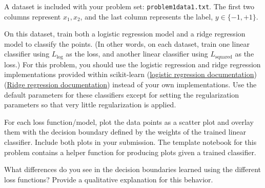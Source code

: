 \newpage

\problem[9]
A dataset is included with your problem set: \texttt{problem1data1.txt}. The first two columns represent $x_1, x_2$, and the last column represents the label, $y \in \{-1,+1\}$.

On this dataset, train both a logistic regression model and a ridge regression model to classify the points.  (In other words, on each dataset, train one linear classifier using $L_\text{log}$ as the loss, and another linear classifier using $L_\text{squared}$ as the loss.) For this problem, you should use the logistic regression and ridge regression implementations provided within scikit-learn 
(\href{http://scikit-learn.org/stable/modules/generated/sklearn.linear_model.LogisticRegression.html}{logistic regression documentation})
(\href{http://scikit-learn.org/stable/modules/generated/sklearn.linear_model.Ridge.html}{Ridge regression documentation})
instead of your own implementations. Use the default parameters for these classifiers except for setting the regularization parameters so that very little regularization is applied.

For each loss function/model, plot the data points as a scatter plot and overlay them with the decision boundary defined by the weights of the trained linear classifier.  Include both plots in your submission. The template notebook for this problem contains a helper function for producing plots given a trained classifier.

What differences do you see in the decision boundaries learned using the different loss functions? Provide a qualitative explanation for this behavior.

